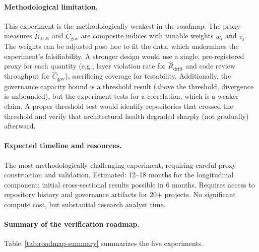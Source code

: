 \documentclass[11pt, a4paper]{googledeepmind}
\begin{document}
\paragraph{Methodological limitation.} This experiment is the methodologically weakest in the roadmap. The proxy measures $\hat{R}_{\text{drift}}$ and $\hat{C}_{\text{gov}}$ are composite indices with tunable weights $w_i$ and $v_j$. The weights can be adjusted post hoc to fit the data, which undermines the experiment's falsifiability. A stronger design would use a single, pre-registered proxy for each quantity (e.g., layer violation rate for $\hat{R}_{\text{drift}}$ and code review throughput for $\hat{C}_{\text{gov}}$), sacrificing coverage for testability. Additionally, the governance capacity bound is a threshold result (above the threshold, divergence is unbounded), but the experiment tests for a correlation, which is a weaker claim. A proper threshold test would identify repositories that crossed the threshold and verify that architectural health degraded sharply (not gradually) afterward.

\paragraph{Expected timeline and resources.} The most methodologically challenging experiment, requiring careful proxy construction and validation. Estimated: 12--18 months for the longitudinal component; initial cross-sectional results possible in 6 months. Requires access to repository history and governance artifacts for 20+ projects. No significant compute cost, but substantial research analyst time.

\paragraph{Summary of the verification roadmap.} Table~\ref{tab:roadmap-summary} summarizes the five experiments.
\end{document}
